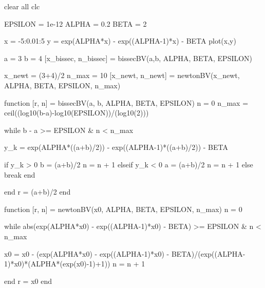 clear all
clc

EPSILON = 1e-12	%
ALPHA = 0.2	%
BETA = 2	%

x = -5:0.01:5	%
y = exp(ALPHA*x) - exp((ALPHA-1)*x) - BETA	%
plot(x,y)

a = 3	%
b = 4	%
[x_bissec, n_bissec] = bissecBV(a,b, ALPHA, BETA, EPSILON)

x_newt = (3+4)/2
n_max = 10
[x_newt, n_newt] = newtonBV(x_newt, ALPHA, BETA, EPSILON, n_max)


function [r, n] = bissecBV(a, b, ALPHA, BETA, EPSILON)
	n = 0	%
	n_max = ceil((log10(b-a)-log10(EPSILON))/(log10(2)))	%

	while b - a >= EPSILON & n < n_max

		y_k = exp(ALPHA*((a+b)/2)) - exp((ALPHA-1)*((a+b)/2)) - BETA

		if y_k > 0
			b = (a+b)/2
			n = n + 1
		elseif y_k < 0
			a = (a+b)/2
			n = n + 1
		else
			break
		end

	end
	r = (a+b)/2
end

function [r, n] = newtonBV(x0, ALPHA, BETA, EPSILON, n_max)
	n = 0

	while abs(exp(ALPHA*x0) - exp((ALPHA-1)*x0) - BETA) >= EPSILON & n < n_max

		x0 = x0 - (exp(ALPHA*x0) - exp((ALPHA-1)*x0) - BETA)/(exp((ALPHA-1)*x0)*(ALPHA*(exp(x0)-1)+1))
		n = n + 1

	end
	r = x0
end